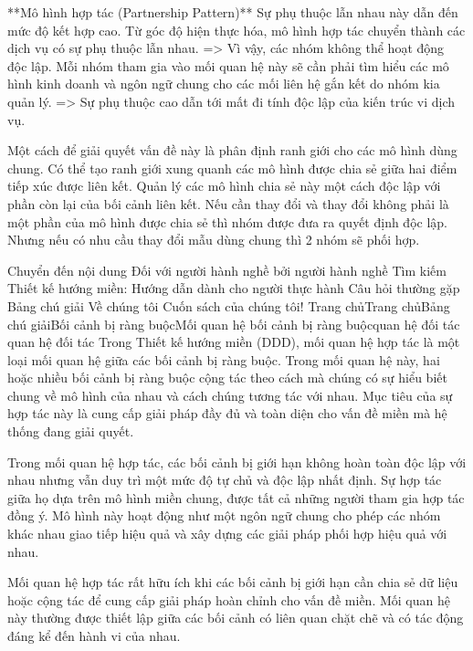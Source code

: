 **Mô hình hợp tác (Partnership Pattern)**
Sự phụ thuộc lẫn nhau này dẫn đến mức độ kết hợp cao.
Từ góc độ hiện thực hóa, mô hình hợp tác chuyển thành các dịch vụ có sự phụ thuộc lẫn nhau.
=> Vì vậy, các nhóm không thể hoạt động độc lập.
Mỗi nhóm tham gia vào mối quan hệ này sẽ cần phải tìm hiểu các mô hình kinh doanh và ngôn ngữ chung cho các mối liên hệ gắn kết do nhóm kia quản lý.
=> Sự phụ thuộc cao dẫn tới mất đi tính độc lập của kiến trúc vi dịch vụ.

Một cách để giải quyết vấn đề này là phân định ranh giới cho các mô hình dùng chung.
Có thể tạo ranh giới xung quanh các mô hình được chia sẻ giữa hai điểm tiếp xúc được liên kết.
Quản lý các mô hình chia sẻ này một cách độc lập với phần còn lại của bối cảnh liên kết.
Nếu cần thay đổi và thay đổi không phải là một phần của mô hình được chia sẻ thì nhóm được đưa ra quyết định độc lập.
Nhưng nếu có nhu cầu thay đổi mẫu dùng chung thì 2 nhóm sẽ phối hợp.


Chuyển đến nội dung
Đối với người hành nghề bởi người hành nghề
Tìm kiếm
Thiết kế hướng miền: Hướng dẫn dành cho người thực hành
Câu hỏi thường gặp
Bảng chú giải
Về chúng tôi
Cuốn sách của chúng tôi!
Trang chủTrang chủBảng chú giảiBối cảnh bị ràng buộcMối quan hệ bối cảnh bị ràng buộcquan hệ đối tác
quan hệ đối tác
Trong Thiết kế hướng miền (DDD), mối quan hệ hợp tác là một loại mối quan hệ giữa các bối cảnh bị ràng buộc. Trong mối quan hệ này, hai hoặc nhiều bối cảnh bị ràng buộc cộng tác theo cách mà chúng có sự hiểu biết chung về mô hình của nhau và cách chúng tương tác với nhau. Mục tiêu của sự hợp tác này là cung cấp giải pháp đầy đủ và toàn diện cho vấn đề miền mà hệ thống đang giải quyết.

Trong mối quan hệ hợp tác, các bối cảnh bị giới hạn không hoàn toàn độc lập với nhau nhưng vẫn duy trì một mức độ tự chủ và độc lập nhất định. Sự hợp tác giữa họ dựa trên mô hình miền chung, được tất cả những người tham gia hợp tác đồng ý. Mô hình này hoạt động như một ngôn ngữ chung cho phép các nhóm khác nhau giao tiếp hiệu quả và xây dựng các giải pháp phối hợp hiệu quả với nhau.

Mối quan hệ hợp tác rất hữu ích khi các bối cảnh bị giới hạn cần chia sẻ dữ liệu hoặc cộng tác để cung cấp giải pháp hoàn chỉnh cho vấn đề miền. Mối quan hệ này thường được thiết lập giữa các bối cảnh có liên quan chặt chẽ và có tác động đáng kể đến hành vi của nhau.

